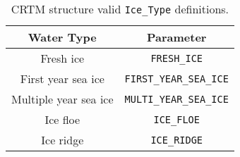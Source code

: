 \begin{table}
  \centering
  \begin{tabular}{|c|c|}
    \hline
    \sffamily\textbf{Water Type} & \sffamily\textbf{Parameter} \\
    \hline\hline
            Fresh ice        &   \texttt{FRESH\_ICE} \\       
        First year sea ice   &   \texttt{FIRST\_YEAR\_SEA\_ICE} \\
      Multiple year sea ice  &   \texttt{MULTI\_YEAR\_SEA\_ICE} \\
            Ice floe         &   \texttt{ICE\_FLOE} \\            
            Ice ridge        &   \texttt{ICE\_RIDGE} \\           
    \hline
  \end{tabular}
  \caption{CRTM \Surface{} structure valid \texttt{Ice\_Type} definitions.}
  \label{tab:surface_ice_type}
\end{table}
%
%
%
%
%
%
